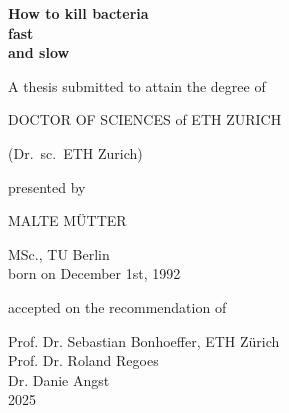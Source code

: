 
\begin{titlingpage}
  
	\begin{center}
	

  \vspace*{1.5cm}

  {\LARGE\textbf{How to kill bacteria\\[6pt]
  fast \\[6pt] and slow}}


  \vspace*{2cm}
  A thesis submitted to attain the degree of

  \uppercase{Doctor of Sciences} of \uppercase{ETH Zurich}

  (Dr.\ sc.\ ETH Zurich)

  \vspace*{1cm}

  presented by

  \uppercase{Malte Mütter}

  MSc., TU Berlin \\
  born on December 1st, 1992 \\


  \vspace*{4cm}

  
  accepted on the recommendation of

  Prof. Dr. Sebastian Bonhoeffer, ETH Zürich \\
  Prof. Dr. Roland Regoes \\
  Dr. Danie Angst \\


  \vspace*{\fill}
  2025

	\end{center}
\end{titlingpage}
\restoregeometry%
